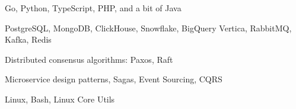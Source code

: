 \item Go, Python, TypeScript, PHP, and a bit of Java
\item PostgreSQL, MongoDB, ClickHouse, Snowflake, BigQuery Vertica, RabbitMQ,
  Kafka, Redis
\item Distributed consensus algorithms: Paxos, Raft
\item Microservice design patterns, Sagas, Event Sourcing, CQRS
\item Linux, Bash, Linux Core Utils
